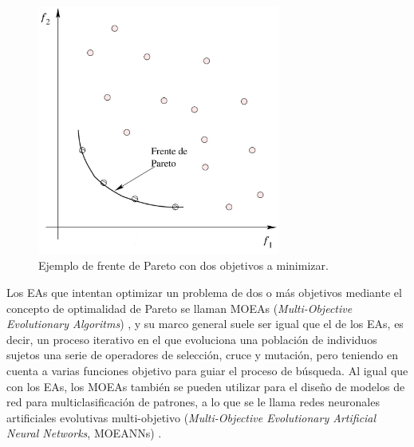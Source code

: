 \begin{figure}[htb]
\centering
\includegraphics[keepaspectratio,width=8cm]{figuras/frentePareto.jpg}
\caption{Ejemplo de frente de Pareto con dos objetivos a minimizar.}
\label{frente}
\end{figure}

Los EAs que intentan optimizar un problema de dos o más objetivos
mediante el concepto de
optimalidad de Pareto se llaman MOEAs (\textit{Multi-Objective Evolutionary Algoritms})
\cite{Deb2004,Coello2007}, y su marco general suele ser igual que el de los EAs, es decir,
un proceso iterativo en el que evoluciona una población de individuos sujetos una serie de
operadores de selección, cruce y mutación, pero teniendo en cuenta a varias funciones
objetivo para guiar el proceso de búsqueda. Al igual que con los EAs, los MOEAs también se
pueden utilizar para el diseño de modelos de red para multiclasificación de patrones, a lo
que se le llama redes neuronales artificiales evolutivas multi-objetivo
(\textit{Multi-Objective Evolutionary Artificial Neural Networks}, MOEANNs)
\cite{Jin2006c}.

